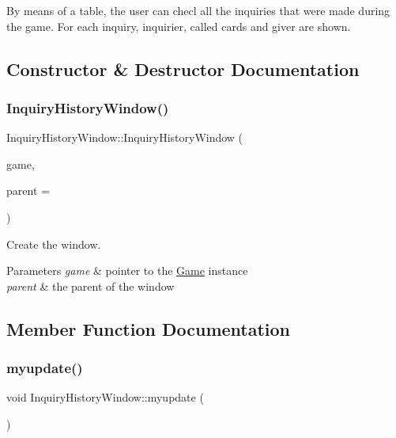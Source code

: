 By means of a table, the user can checl all the inquiries that were made during the game. For each inquiry, inquirier, called cards and giver are shown. 

\subsection{Constructor \& Destructor Documentation}
\mbox{\label{classInquiryHistoryWindow_aad56e5a394ab749c4621a57016a7dfe0}} 
\subsubsection{\texorpdfstring{Inquiry\+History\+Window()}{InquiryHistoryWindow()}}
{\footnotesize\ttfamily Inquiry\+History\+Window\+::\+Inquiry\+History\+Window (\begin{DoxyParamCaption}\item[{\hyperlink{classGame}{Game} $\ast$}]{game,  }\item[{Q\+Widget $\ast$}]{parent = {} }\end{DoxyParamCaption})}



Create the window. 


\begin{DoxyParams}{Parameters}
{\em game} & pointer to the \hyperlink{classGame}{Game} instance \\
\hline
{\em parent} & the parent of the window \\
\hline
\end{DoxyParams}


\subsection{Member Function Documentation}
\mbox{\label{classInquiryHistoryWindow_ac57591d79ca9911cd085d80411a7d440}} 
\subsubsection{\texorpdfstring{myupdate()}{myupdate()}}
{\footnotesize\ttfamily void Inquiry\+History\+Window\+::myupdate (\begin{DoxyParamCaption}{ }\end{DoxyParamCaption})}



